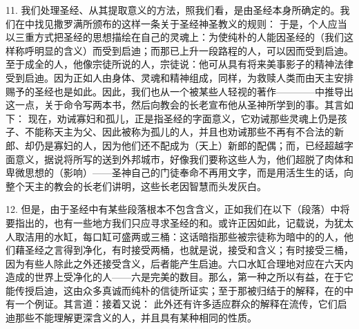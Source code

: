 11. 我们处理圣经、从其提取意义的方法，照我们看，是由圣经本身所确定的。我们在中找见撒罗满所颁布的这样一条关于圣经神圣教义的规则： 于是，个人应当以三重方式把圣经的思想描绘在自己的灵魂上：为使纯朴的人能因圣经的（我们这样称呼明显的含义）而受到启迪；而那已上升一段路程的人，可以因而受到启迪。至于成全的人，他像宗徒所说的人，宗徒说：他可从具有将来美事影子的精神法律受到启迪。因为正如人由身体、灵魂和精神组成，同样，为救赎人类而由天主安排赐予的圣经也是如此。因此，我们也从一个被某些人轻视的著作————中推导出这一点，关于命令写两本书，然后向教会的长老宣布他从圣神所学到的事。其言如下： 现在，劝诫寡妇和孤儿，正是指圣经的字面意义，它劝诫那些灵魂上仍是孩子、不能称天主为父、因此被称为孤儿的人，并且也劝诫那些不再有不合法的新郎、却仍是寡妇的人，因为他们还不配成为（天上）新郎的配偶；而，已经超越字面意义，据说将所写的送到外邦城市，好像我们要称这些人为，他们超脱了肉体和卑微思想的（影响）——圣神自己的门徒奉命不再用文字，而是用活生生的话，向整个天主的教会的长老们讲明，这些长老因智慧而头发灰白。\par

12. 但是，由于圣经中有某些段落根本不包含含义，正如我们在以下（段落）中将要指出的，也有一些地方我们只应寻求圣经的和。或许正因如此，记载说，为犹太人取洁用的水缸，每口缸可盛两或三桶：这话暗指那些被宗徒称为暗中的的人，他们藉圣经之言得到净化，有时接受两桶，也就是说，接受和含义；有时接受三桶，因为有些人除此之外还接受含义，后者能产生启迪。六口水缸合理地对应在六天内造成的世界上受净化的人——六是完美的数目。那么，第一种之所以有益，在于它能传授启迪，这由众多真诚而纯朴的信徒所证实；至于那被归结于的解释，在的中有一个例证。其言道：接着又说： 此外还有许多适应群众的解释在流传，它们启迪那些不能理解更深含义的人，并且具有某种相同的性质。\par

